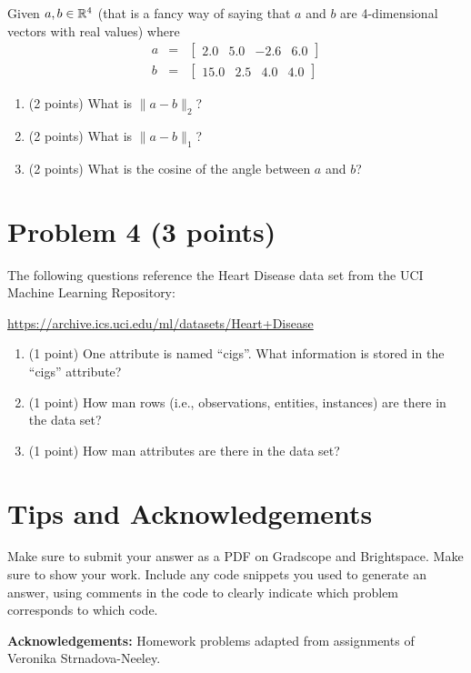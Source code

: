 \documentclass[11pt]{article}
\begin{document}
Given $a, b \in \mathbb{R}^4$ (that is a fancy way of saying that $a$ and $b$ are
4-dimensional vectors with real values) where
\begin{eqnarray*}
    a &=& \begin{bmatrix} 2.0  & 5.0 & -2.6 & 6.0 \end{bmatrix} \\
    b &=& \begin{bmatrix} 15.0 & 2.5 &  4.0 & 4.0 \end{bmatrix}
\end{eqnarray*}

\begin{enumerate}
    \item (2 points) What is $\|a-b\|_2$?
    \item (2 points) What is $\|a-b\|_1$?
    \item (2 points) What is the cosine of the angle between $a$ and $b$?
\end{enumerate}

\section*{Problem 4 (3 points)}

The following questions reference the Heart Disease data set from the UCI
Machine Learning Repository:

\url{https://archive.ics.uci.edu/ml/datasets/Heart+Disease}

\begin{enumerate}
    \item (1 point) One attribute is named ``cigs''.  What information is stored
    in the ``cigs'' attribute?
    \item (1 point) How man rows (i.e., observations, entities, instances) are
    there in the data set?
    \item (1 point) How man attributes are there in the data set?
\end{enumerate}

\section*{Tips and Acknowledgements}

Make sure to submit your answer as a PDF on Gradscope and Brightspace. Make sure
to show your work. Include any code snippets you used to generate an answer,
using comments in the code to clearly indicate which problem corresponds to
which code.


{\bf Acknowledgements:} Homework problems adapted from assignments of
Veronika Strnadova-Neeley.
\end{document}
